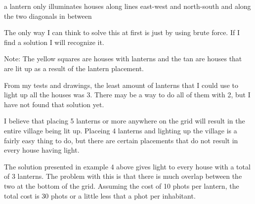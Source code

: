 \documentclass[12pt]{article}
\begin{document}
\vspace{10mm}

a lantern only illuminates houses along lines east-west and north-south and along the two diagonals in between

\vspace{5mm}
The only way I can think to solve this at first is just by using brute force. If I find a solution I will recognize it.

\vspace{5mm}



Note: The yellow squares are houses with lanterns and the tan are houses that are lit up as a result of the lantern placement.

\vspace{5mm}

From my tests and drawings, the least amount of lanterns that I could use to light up all the houses was 3.
There may be a way to do all of them with 2, but I have not found that solution yet.

\vspace{5mm}
I believe that placing 5 lanterns or more anywhere on the grid will result in the entire village being lit up.
Placeing 4 lanterns and lighting up the village is a fairly easy thing to do, but there are certain placements that do not result in every house having light.

\vspace{5mm}
The solution presented in example 4 above gives light to every house with a total of 3 lanterns. The problem with this is that there is much overlap between the two at the bottom of the grid.
Assuming the cost of 10 phots per lantern, the total cost is 30 phots or a little less that a phot per inhabitant.
\end{document}
